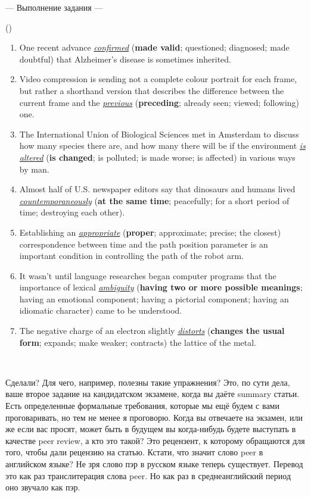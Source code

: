 \documentclass[main.tex]{subfiles}
\begin{document}
\hypertarget{ltask:2023-11-29-3}{--- Выполнение задания ---} (\hyperref[task:2023-11-29]{\color{blue}{перейти к тексту задания упр.2.6.3.}})
\\


\begin{enumerate}[nosep,leftmargin=8mm]
	\itemsep\eitsp
	\item One recent advance \textit{\uline{confirmed}} (\textbf{made valid}; questioned; diagnosed; made doubtful) that Alzheimer's disease is sometimes inherited.
	\item Video compression is sending not a complete colour portrait for each frame, but rather a shorthand version that describes the difference between the current frame and the \textit{\uline{previous}} (\textbf{preceding}; already seen; viewed; following) one.
	\item The International Union of Biological Sciences met in Amsterdam to discuss how many species there are, and how many there will be if the environment \textit{\uline{is altered}} (\textbf{is changed}; is polluted; is made worse; is affected) in various ways by man.
	\item Almost half of U.S. newspaper editors say that dinosaurs and humans lived \textit{\uline{countemporaneously}} (\textbf{at the same time}; peacefully; for a short period of time; destroying each other).
	\item Establishing an \textit{\uline{appropriate}} (\textbf{proper}; approximate; precise; the closest) correspondence between time and the path position parameter is an important condition in controlling the path of the robot arm.
	\item It wasn't until language researches began computer programs that the importance of lexical \textit{\uline{ambiguity}} (\textbf{having two or more possible meanings}; having an emotional component; having a pictorial component; having an idiomatic character) came to be understood.
	\item The negative charge of an electron slightly \textit{\uline{distorts}} (\textbf{changes the usual form}; expands; make weaker; contracts) the lattice of the metal.
\end{enumerate}
\ 

Сделали?
Для чего, например, полезны такие упражнения?
Это, по сути дела, ваше второе задание на кандидатском экзамене, когда вы даёте summary статьи.
Есть определенные формальные требования, которые мы ещё будем с вами проговаривать, но тем не менее я проговорю.
Когда вы отвечаете на экзамен, или же если вас просят, может быть в будущем вы когда-нибудь будете выступать в качестве peer review, а кто это такой?
Это рецензент, к которому обращаются для того, чтобы дали рецензию на статью.
Кстати, что значит слово peer в английском языке?
Не зря слово пэр в русском языке теперь существует.
Перевод это как раз транслитерация слова peer.
Но как раз в среднеанглийский период оно звучало как пэр.
\end{document}
